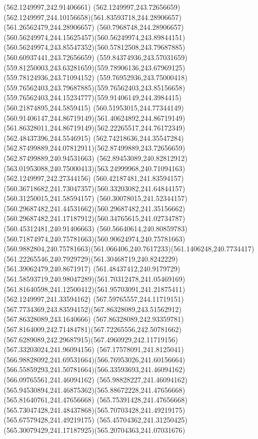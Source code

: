 {{	\lineto(562.1249997,242.91406661)
	\lineto(562.1249997,243.72656659)
	\curveto(562.1249997,244.10156658)(561.83593718,244.28906657)(561.26562479,244.28906657)
	\curveto(560.7968748,244.28906657)(560.56249974,244.15625457)(560.56249974,243.89844151)
	\curveto(560.56249974,243.85547352)(560.57812508,243.79687885)(560.60937441,243.72656659)
	\lineto(559.84374936,243.57031659)
	\curveto(559.81250003,243.63281659)(559.78906136,243.67969125)(559.78124936,243.71094152)
	\curveto(559.76952936,243.75000418)(559.76562403,243.79687885)(559.76562403,243.85156658)
	\curveto(559.76562403,244.15234777)(559.91406149,244.3984415)(560.21874895,244.5859415)
	\curveto(560.51953015,244.77344149)(560.91406147,244.86719149)(561.40624892,244.86719149)
	\curveto(561.86328011,244.86719149)(562.22265517,244.76172349)(562.48437396,244.5546915)
	\curveto(562.74218636,244.35547284)(562.87499889,244.07812911)(562.87499889,243.72656659)
	\lineto(562.87499889,240.94531663)
	\curveto(562.89453089,240.82812912)(563.01953088,240.75000413)(563.24999968,240.71094163)
	\closepath
	\moveto(562.1249997,242.27344156)
	\lineto(560.42187481,241.83594157)
	\curveto(560.36718682,241.73047357)(560.33203082,241.64844157)(560.31250015,241.58594157)
	\curveto(560.30078015,241.52344157)(560.29687482,241.44531662)(560.29687482,241.35156662)
	\curveto(560.29687482,241.17187912)(560.34765615,241.02734787)(560.45312481,240.91406663)
	\curveto(560.56640614,240.80859783)(560.71874974,240.75781663)(560.90624974,240.75781663)
	\curveto(560.9882804,240.75781663)(561.066406,240.7617233)(561.1406248,240.7734417)
	\curveto(561.22265546,240.7929729)(561.30468719,240.8242229)(561.39062479,240.8671917)
	\curveto(561.48437412,240.9179729)(561.58593719,240.98047289)(561.70312478,241.05469169)
	\curveto(561.81640598,241.12500412)(561.95703091,241.21875411)(562.1249997,241.33594162)
	\closepath
	\moveto(567.59765557,244.11719151)
	\curveto(567.7734369,243.83594152)(567.86328089,243.51562912)(567.86328089,243.1640666)
	\curveto(567.86328089,242.93359781)(567.8164009,242.71484781)(567.72265556,242.50781662)
	\curveto(567.6289089,242.29687915)(567.4960929,242.11719156)(567.33203024,241.96094156)
	\curveto(567.17578091,241.8125041)(566.98828092,241.69531664)(566.76953026,241.60156664)
	\curveto(566.55859293,241.50781664)(566.33593693,241.46094162)(566.09765561,241.46094162)
	\lineto(565.98828227,241.46094162)
	\curveto(565.94530894,241.46875362)(565.88672228,241.47656668)(565.81640761,241.47656668)
	\lineto(565.75391428,241.47656668)
	\curveto(565.73047428,241.48437868)(565.70703428,241.49219175)(565.67579428,241.49219175)
	\curveto(565.45704362,241.31250425)(565.30079429,241.17187925)(565.20704363,241.07031676)
}}
